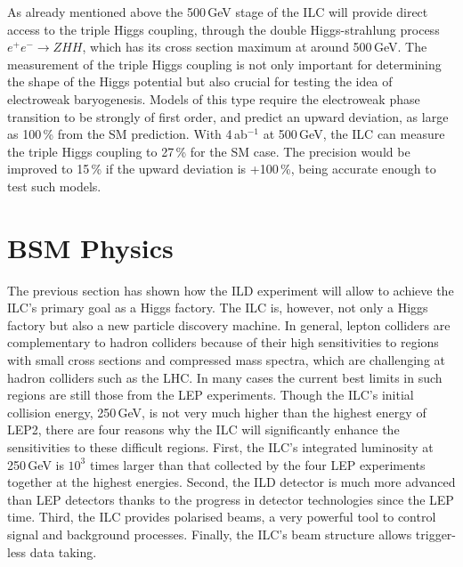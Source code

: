 As already mentioned above the 500\,GeV stage of the ILC will provide direct access to the triple Higgs coupling, through the double Higgs-strahlung process $e^+e^- \to ZHH$, which has its cross section maximum at around 500\,GeV. The measurement of the triple Higgs coupling is not only important for determining the shape of the Higgs potential but also crucial for testing the idea of electroweak baryogenesis. Models of this type require the electroweak phase transition to be strongly of first order, and predict an upward deviation, as large as 100\,\% from the SM prediction\cite{Ref:EWBG1,Ref:EWBG2,Ref:EWBG3}. With 4\,ab$^{-1}$ at 500\,GeV, the ILC can measure the triple Higgs coupling to 27\,\% for the SM case\cite{Ref:Claude}. The precision would be improved to 15\,\% if the upward deviation is +100\,\%, being accurate enough to test such models. 
%
%
\section{BSM Physics}
 The previous section has shown how the ILD experiment will allow to achieve the ILC's primary goal as a Higgs factory. The ILC is, however, not only a Higgs factory but also a new particle discovery machine. In general, lepton colliders are complementary to hadron colliders because of their high sensitivities to regions with small cross sections and compressed mass spectra, which are challenging at hadron colliders such as the LHC. In many cases the current best limits in such regions are still those from the LEP experiments. Though the ILC's initial collision energy, 250\,GeV, is not very much higher than the highest energy of LEP2, there are four reasons why the ILC will significantly enhance the sensitivities to these difficult regions. First, the ILC's integrated luminosity at 250\,GeV is $10^3$ times larger than that collected by the four LEP experiments together at the highest energies. Second, the ILD detector is much more advanced than LEP detectors thanks to the progress in detector technologies since the LEP time. Third, the ILC provides polarised beams, a very powerful tool to control signal and background processes. Finally, the ILC's beam structure allows trigger-less data taking. 
 
